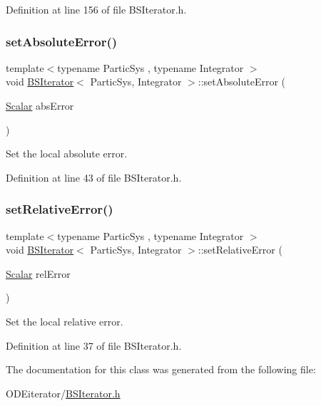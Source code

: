 Definition at line 156 of file B\+S\+Iterator.\+h.

\mbox{\label{class_b_s_iterator_a57603539823be271c2229d0951b7d957}} 
\subsubsection{\texorpdfstring{set\+Absolute\+Error()}{setAbsoluteError()}}
{\footnotesize\ttfamily template$<$typename Partic\+Sys , typename Integrator $>$ \\
void \mbox{\hyperlink{class_b_s_iterator}{B\+S\+Iterator}}$<$ Partic\+Sys, Integrator $>$\+::set\+Absolute\+Error (\begin{DoxyParamCaption}\item[{\mbox{\hyperlink{class_b_s_iterator_a44773ad0f46d97005c8e21fa7c155c6f}{Scalar}}}]{abs\+Error }\end{DoxyParamCaption})\hspace{0.3cm}{\ttfamily [inline]}}



Set the local absolute error. 



Definition at line 43 of file B\+S\+Iterator.\+h.

\mbox{\label{class_b_s_iterator_ada9b6cc673e297135646699d581fcdc7}} 
\subsubsection{\texorpdfstring{set\+Relative\+Error()}{setRelativeError()}}
{\footnotesize\ttfamily template$<$typename Partic\+Sys , typename Integrator $>$ \\
void \mbox{\hyperlink{class_b_s_iterator}{B\+S\+Iterator}}$<$ Partic\+Sys, Integrator $>$\+::set\+Relative\+Error (\begin{DoxyParamCaption}\item[{\mbox{\hyperlink{class_b_s_iterator_a44773ad0f46d97005c8e21fa7c155c6f}{Scalar}}}]{rel\+Error }\end{DoxyParamCaption})\hspace{0.3cm}{\ttfamily [inline]}}



Set the local relative error. 



Definition at line 37 of file B\+S\+Iterator.\+h.



The documentation for this class was generated from the following file\+:\begin{DoxyCompactItemize}
\item 
O\+D\+Eiterator/\mbox{\hyperlink{_b_s_iterator_8h}{B\+S\+Iterator.\+h}}\end{DoxyCompactItemize}
